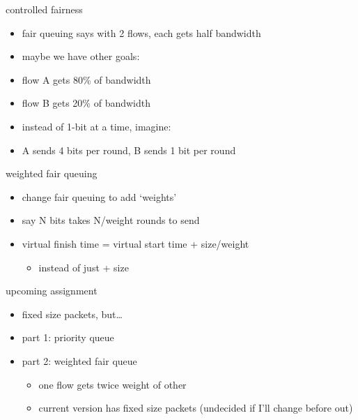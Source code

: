 \begin{frame}{controlled fairness}
    \begin{itemize}
    \item fair queuing says with 2 flows, each gets half bandwidth
    \item maybe we have other goals:
    \item flow A gets 80\% of bandwidth
    \item flow B gets 20\% of bandwidth
    \vspace{.5cm}
    \item<2-> instead of 1-bit at a time, imagine:
    \item<2-> A sends 4 bits per round, B sends 1 bit per round
    \end{itemize}
\end{frame}

\begin{frame}{weighted fair queuing}
    \begin{itemize}
    \item change fair queuing to add `weights'
    \item say N bits takes N/weight rounds to send
    \vspace{.5cm}
    \item virtual finish time = virtual start time + size/weight
        \begin{itemize}
        \item instead of just + size
        \end{itemize}
    \end{itemize}
\end{frame}

\begin{frame}{upcoming assignment}
    \begin{itemize}
    \item fixed size packets, but\ldots
    \item part 1: priority queue
    \item part 2: weighted fair queue
        \begin{itemize}
        \item one flow gets twice weight of other
        \item current version has fixed size packets (undecided if I'll change before out)
        \end{itemize}
    \end{itemize}
\end{frame}
